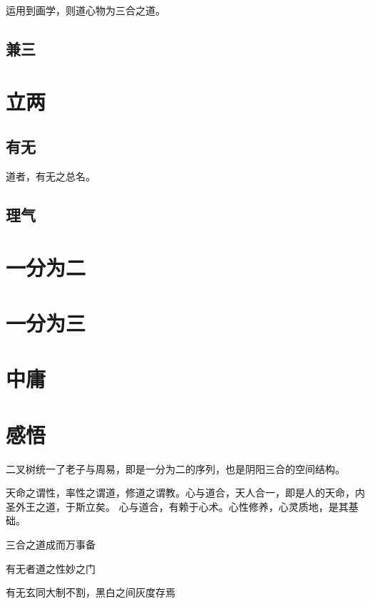 运用到画学，则道心物为三合之道。

\subsection{兼三}

\section{立两}

\subsection{有无}

道者，有无之总名。

\subsection{理气}

\section{一分为二}

\section{一分为三}

\section{中庸}

\section{感悟}

二叉树统一了老子与周易，即是一分为二的序列，也是阴阳三合的空间结构。

天命之谓性，率性之谓道，修道之谓教。心与道合，天人合一，即是人的天命，内圣外王之道，于斯立矣。
心与道合，有赖于心术。心性修养，心灵质地，是其基础。

三合之道成而万事备

有无者道之性妙之门

有无玄同大制不割，黑白之间灰度存焉
